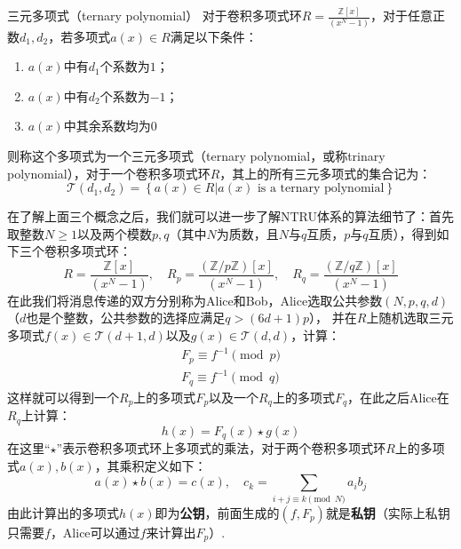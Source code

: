 \documentclass{book}
\numberwithin{equation}{subsubsection}
\begin{document}
\begin{concept}{三元多项式（ternary polynomial）}
    对于卷积多项式环$R=\frac{\mathbb{Z}[x]}{(x^{N}-1)}$，对于任意正数$d_1,d_2$，若多项式$a(x)\in R$满足以下条件：
    \begin{enumerate}
        \item $a(x)$中有$d_1$个系数为$1$；
        \item $a(x)$中有$d_2$个系数为$-1$；
        \item $a(x)$中其余系数均为$0$
    \end{enumerate}
    则称这个多项式为一个三元多项式（ternary polynomial，或称trinary polynomial），对于一个卷积多项式环$R$，其上的所有三元多项式的集合记为：
    \begin{equation}
        \mathcal{T}(d_1,d_2)=\left\{a(x)\in R| a(x)\text{ is a ternary polynomial}\right\}
        \nonumber
    \end{equation}
\end{concept}
在了解上面三个概念之后，我们就可以进一步了解NTRU体系的算法细节了：首先取整数$N\ge1$以及两个模数$p,q$（其中$N$为质数，且$N$与$q$互质，$p$与$q$互质），得到如下三个卷积多项式环：
\begin{equation}
    R=\frac{\mathbb{Z}[x]}{(x^{N}-1)},\quad R_p=\frac{(\mathbb{Z}/p\mathbb{Z})[x]}{(x^{N}-1)},\quad R_q=\frac{(\mathbb{Z}/q\mathbb{Z})[x]}{(x^{N}-1)}
    \nonumber
\end{equation}
在此我们将消息传递的双方分别称为Alice和Bob，Alice选取公共参数$(N,p,q,d)$（$d$也是个整数，公共参数的选择应满足$q>(6d+1)p$），
并在$R$上随机选取三元多项式$f(x)\in\mathcal{T}(d+1,d)$以及$g(x)\in\mathcal{T}(d,d)$，计算：
\begin{equation}
    \begin{aligned}
        F_p\equiv f^{-1}\pmod{p}\\
        F_q\equiv f^{-1}\pmod{q}
    \end{aligned}
    \nonumber
\end{equation}
这样就可以得到一个$R_p$上的多项式$F_p$以及一个$R_q$上的多项式$F_q$，在此之后Alice在$R_q$上计算：
\begin{equation}
    h(x)=F_q(x)\star g(x)
    \nonumber
\end{equation}
在这里“$\star$”表示卷积多项式环上多项式的乘法，对于两个卷积多项式环$R$上的多项式$a(x),b(x)$，其乘积定义如下：
\begin{equation}
    a(x)\star b(x)=c(x),\quad c_k=\sum_{i+j\equiv k\pmod{N}}{a_{i}b_{j}}
    \nonumber
\end{equation}
由此计算出的多项式$h(x)$即为\textbf{公钥}，前面生成的$(f,F_p)$就是\textbf{私钥}（实际上私钥只需要$f$，Alice可以通过$f$来计算出$F_p$）.
\end{document}
